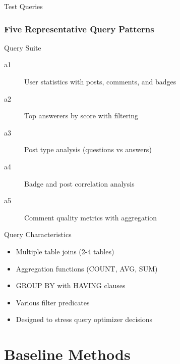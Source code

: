 \documentclass{beamer}
\begin{document}
\begin{frame}{Test Queries}
\frametitle{Five Representative Query Patterns}

\begin{block}{Query Suite}
\begin{description}
    \item[a1] User statistics with posts, comments, and badges
    \item[a2] Top answerers by score with filtering
    \item[a3] Post type analysis (questions vs answers)
    \item[a4] Badge and post correlation analysis
    \item[a5] Comment quality metrics with aggregation
\end{description}
\end{block}

\begin{exampleblock}{Query Characteristics}
\begin{itemize}
    \item Multiple table joins (2-4 tables)
    \item Aggregation functions (COUNT, AVG, SUM)
    \item GROUP BY with HAVING clauses
    \item Various filter predicates
    \item Designed to stress query optimizer decisions
\end{itemize}
\end{exampleblock}


\end{frame}

\section{Baseline Methods}
\end{document}
